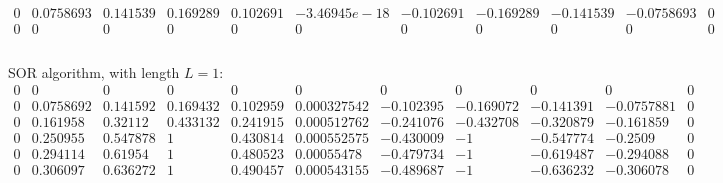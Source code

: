 \documentclass{article}
\begin{document}
\[\begin{array}{ccccccccccc}
\scriptstyle 0  &  \scriptstyle 0.0758693  &  \scriptstyle 0.141539  &  \scriptstyle 0.169289  &  \scriptstyle 0.102691  &  \scriptstyle -3.46945e-18  &  \scriptstyle -0.102691  &  \scriptstyle -0.169289  &  \scriptstyle -0.141539  &  \scriptstyle -0.0758693  &  \scriptstyle 0    \\
\scriptstyle 0  &  \scriptstyle 0  &  \scriptstyle 0  &  \scriptstyle 0  &  \scriptstyle 0  &  \scriptstyle 0  &  \scriptstyle 0  &  \scriptstyle 0  &  \scriptstyle 0  &  \scriptstyle 0  &  \scriptstyle 0    \\
\end{array}
\]
\\\footnotesize{SOR algorithm, with length } $L=1$:
\[
\begin{array}{ccccccccccc}

\scriptstyle 0  &  \scriptstyle 0  &  \scriptstyle 0  &  \scriptstyle 0  &  \scriptstyle 0  &  \scriptstyle 0  &  \scriptstyle 0  &  \scriptstyle 0  &  \scriptstyle 0  &  \scriptstyle 0  &  \scriptstyle 0   \\
\scriptstyle 0  &  \scriptstyle 0.0758692  &  \scriptstyle 0.141592  &  \scriptstyle 0.169432  &  \scriptstyle 0.102959  &  \scriptstyle 0.000327542  &  \scriptstyle -0.102395  &  \scriptstyle -0.169072  &  \scriptstyle -0.141391  &  \scriptstyle -0.0757881  &  \scriptstyle 0    \\
\scriptstyle 0  &  \scriptstyle 0.161958  &  \scriptstyle 0.32112  &  \scriptstyle 0.433132  &  \scriptstyle 0.241915  &  \scriptstyle 0.000512762  &  \scriptstyle -0.241076  &  \scriptstyle -0.432708  &  \scriptstyle -0.320879  &  \scriptstyle -0.161859  &  \scriptstyle 0    \\
\scriptstyle 0  &  \scriptstyle 0.250955  &  \scriptstyle 0.547878  &  \scriptstyle 1  &  \scriptstyle 0.430814  &  \scriptstyle 0.000552575  &  \scriptstyle -0.430009  &  \scriptstyle -1  &  \scriptstyle -0.547774  &  \scriptstyle -0.2509  &  \scriptstyle 0    \\
\scriptstyle 0  &  \scriptstyle 0.294114  &  \scriptstyle 0.61954  &  \scriptstyle 1  &  \scriptstyle 0.480523  &  \scriptstyle 0.00055478  &  \scriptstyle -0.479734  &  \scriptstyle -1  &  \scriptstyle -0.619487  &  \scriptstyle -0.294088  &  \scriptstyle 0    \\
\scriptstyle 0  &  \scriptstyle 0.306097  &  \scriptstyle 0.636272  &  \scriptstyle 1  &  \scriptstyle 0.490457  &  \scriptstyle 0.000543155  &  \scriptstyle -0.489687  &  \scriptstyle -1  &  \scriptstyle -0.636232  &  \scriptstyle -0.306078  &  \scriptstyle 0    \\

\end{array}\]
\end{document}
